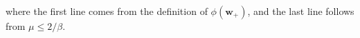 where the first line comes from the definition of $\phi(\bm{w}_+)$, and the last line follows from $\mu \leq 2/\beta$. 
	
	
	
	
	
	
	
	
	
%	
%	
%	
%	
